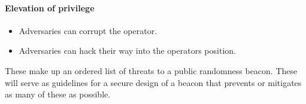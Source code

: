 \paragraph{Elevation of privilege}
\begin{itemize}
    \item Adversaries can corrupt the operator.
    \item Adversaries can hack their way into the operators position.
\end{itemize}

These make up an ordered list of threats to a public randomness beacon. These will serve as guidelines for a secure design of a beacon that prevents or mitigates as many of these as possible.
